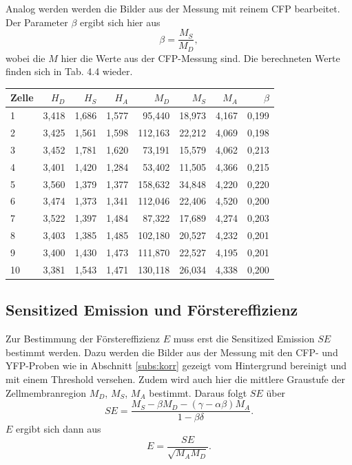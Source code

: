 Analog werden werden die Bilder aus der Messung mit reinem CFP bearbeitet. Der Parameter $\beta$ ergibt sich hier aus
\begin{equation*}
    \beta = \frac{M_S}{M_D}, 
\end{equation*}
wobei die $M$ hier die Werte aus der CFP-Messung sind. Die berechneten Werte finden sich in Tab. 4.4 wieder.


\begin{center}
    \centering
    \begin{tabular}{lrrrrrrr}
        \toprule
        Zelle &  $H_D$ &  $H_S$ &  $H_A$ &    $M_D$ &   $M_S$ &  $M_A$ &  $\beta$ \\
        \midrule
        1     & 3,418 & 1,686 & 1,577 &  95,440 & 18,973 & 4,167 & 0,199 \\
        2     & 3,425 & 1,561 & 1,598 & 112,163 & 22,212 & 4,069 & 0,198 \\
        3     & 3,452 & 1,781 & 1,620 &  73,191 & 15,579 & 4,062 & 0,213 \\
        4     & 3,401 & 1,420 & 1,284 &  53,402 & 11,505 & 4,366 & 0,215 \\
        5     & 3,560 & 1,379 & 1,377 & 158,632 & 34,848 & 4,220 & 0,220 \\
        6     & 3,474 & 1,373 & 1,341 & 112,046 & 22,406 & 4,520 & 0,200 \\
        7     & 3,522 & 1,397 & 1,484 &  87,322 & 17,689 & 4,274 & 0,203 \\
        8     & 3,403 & 1,385 & 1,485 & 102,180 & 20,527 & 4,232 & 0,201 \\
        9     & 3,400 & 1,430 & 1,473 & 111,870 & 22,527 & 4,195 & 0,201 \\
        10    & 3,381 & 1,543 & 1,471 & 130,118 & 26,034 & 4,338 & 0,200 \\
        \bottomrule
    \end{tabular}
    \label{tab:CFP}
\end{center}

\subsection{Sensitized Emission und Förstereffizienz}
Zur Bestimmung der Förstereffizienz $E$ muss erst die Sensitized Emission $SE$ bestimmt werden. Dazu werden die Bilder aus der 
Messung mit den CFP- und YFP-Proben wie in Abschnitt \ref{subs:korr} gezeigt vom Hintergrund bereinigt und mit einem Threshold versehen. 
Zudem wird auch hier die mittlere Graustufe der Zellmembranregion $M_D$, $M_S$, $M_A$ bestimmt. Daraus folgt $SE$ über
\begin{equation*}
    SE = \frac{M_S - \beta M_D - (\gamma - \alpha \beta) M_A}{1 - \beta \delta}.
\end{equation*}
$E$ ergibt sich dann aus 
\begin{equation*}
    E = \frac{SE}{\sqrt{M_A M_D}}.
\end{equation*}


